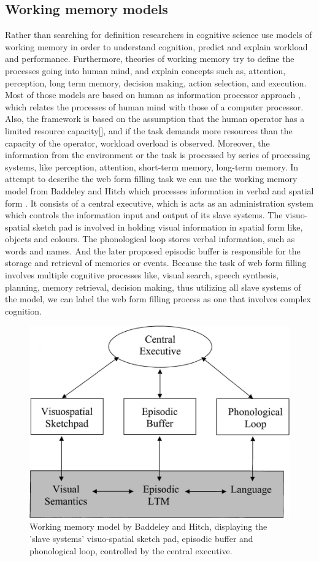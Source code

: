 \documentclass[a4paper]{report}
\begin{document}
			\subsection{Working memory models}
			Rather than searching for definition researchers in cognitive science use models of working memory in order to understand cognition, predict and explain workload and performance. Furthermore, theories of working memory try to define the processes going into human mind, and explain concepts such as, attention, perception, long term memory, decision making, action selection, and execution\cite{wickens-1988,baddeley1974working,miller1956magical}. Most of those models are based on human as information processor approach \cite{broadbent1,broadbent2,neisser,wickens-1988}, which relates the processes of human mind with those of a computer processor. Also, the framework is based on the assumption that the human operator has a limited resource capacity[], and if the task demands more resources than the capacity of the operator, workload overload is observed. Moreover, the information from the environment or the task is processed by series of processing systems, like perception, attention, short-term memory, long-term memory. 
			In attempt to describe the web form filling task we can use the working memory model from Baddeley and Hitch \cite{baddeley1974working} which processes information in verbal and spatial form . It consists of a central executive, which is acts as an administration system which controls the information input and output of its slave systems. The visuo-spatial sketch pad is involved in holding visual information in spatial form like, objects and colours. The phonological loop stores verbal information, such as words and names. And the later proposed \cite{baddeley2000episodic} episodic buffer is responsible for the storage and retrieval of memories or events. Because the task of web form filling involves multiple cognitive processes like, visual search, speech synthesis, planning, memory retrieval, decision making, thus utilizing all slave systems of the model, we can label the web form filling process as one that involves complex cognition. 
				\begin{figure}[h]
					\centering
					\includegraphics[width=0.5\linewidth]{baddeley-wm}
					\caption[Baddeley and Hitch Working memory model]{Working memory model by Baddeley and Hitch, displaying the 'slave systems' visuo-spatial sketch pad, episodic buffer and phonological loop, controlled by the central executive.}
					\label{fig:baddeley-wm}
				\end{figure}		
				
\end{document}
